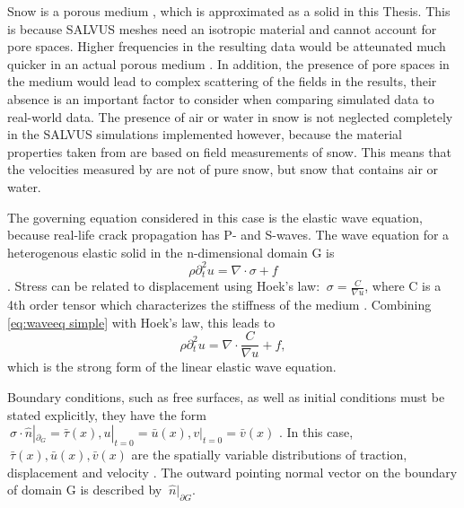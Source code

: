 \documentclass[10pt]{article}
\begin{document}
Snow is a porous medium \parencite{mellorEngineeringPropertiesSnow1977}, which is approximated as a solid in this Thesis. This is because SALVUS meshes need an isotropic material and cannot account for pore spaces. Higher frequencies in the resulting data would be atteunated much quicker in an actual porous medium \parencite{koushikDevelopmentSeismicSignalbased2024}. In addition, the presence of pore spaces in the medium would lead to complex scattering of the fields in the results, their absence is an important factor to consider when comparing simulated data to real-world data. The presence of air or water in snow is not neglected completely in the SALVUS simulations implemented however, because the material properties taken from \cite{guillemotEffectSnowfallChanges2021} are based on field measurements of snow. This means that the velocities measured by \cite{guillemotEffectSnowfallChanges2021} are not of pure snow, but snow that contains air or water. \par

The governing equation considered in this case is the elastic wave equation, because real-life crack propagation has P- and S-waves. The wave equation for a heterogenous elastic solid in the n-dimensional domain G is 
\begin{equation}
  \rho\partial_t^2u = \nabla \cdot \sigma + f
  \label{eq:waveeq simple}
\end{equation} \parencite{afanasievModularFlexibleSpectralelement2019,kAkiRichards19801981}. Stress can be related to displacement using Hoek's law: $\ \sigma = \frac{C}{\nabla u}$, where C is a 4th order tensor which characterizes the stiffness of the medium \parencite{afanasievModularFlexibleSpectralelement2019}. Combining \ref{eq:waveeq simple} with Hoek's law, this leads to \begin{equation}
\rho\partial_t^2u = \nabla \cdot \frac{C}{\nabla u} + f,
\label{eq:strong form}
\end{equation} which is the strong form of the linear elastic wave equation. \par


Boundary conditions, such as free surfaces, as well as initial conditions must be stated explicitly, they have the form $\ \sigma \cdot \hat{n}|_{\partial_G} = \bar{\tau}(x), u|_{t=0} = \bar{u}(x), v|_{t=0} = \bar{v}(x)$ \parencite{afanasievModularFlexibleSpectralelement2019}. In this case, $\ \bar{\tau}(x), \bar{u}(x), \bar{v}(x) $ are the spatially variable distributions of traction, displacement and velocity \parencite{afanasievModularFlexibleSpectralelement2019}. The outward pointing normal vector on the boundary of domain G is described by $\ \hat{n}|_{\partial G}$. \par
\end{document}

